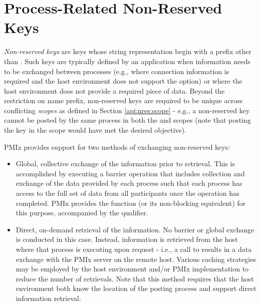 \chapter{Process-Related Non-Reserved Keys}
\label{chap:nrkeys}

\emph{Non-reserved keys} are keys whose string representation begin with a
prefix other than . Such keys are typically defined by an
application when information needs to be exchanged between processes (e.g.,
where connection information is required and the host environment does not
support the  option) or where the host environment does not
provide a required piece of data. Beyond the restriction on name prefix,
non-reserved keys are required to be unique across conflicting \emph{scopes} as defined in Section \ref{api:nres:scope} - e,g., a non-reserved key cannot be posted by the same process in both the  and  scopes (note that posting the key in the  scope would have met the desired objective).

\ac{PMIx} provides support for two methods of exchanging non-reserved keys:

\begin{itemize}
    \item Global, collective exchange of the information prior to retrieval. This is accomplished by executing a barrier operation that includes collection and exchange of the data provided by each process such that each process has access to the full set of data from all participants once the operation has completed. \ac{PMIx} provides the  function (or its non-blocking equivalent) for this purpose, accompanied by the  qualifier.
    \item Direct, on-demand retrieval of the information. No barrier or global exchange is conducted in this case. Instead, information is retrieved from the host where that process is executing upon request - i.e., a call to  results in a data exchange with the \ac{PMIx} server on the remote host. Various caching strategies may be employed by the host environment and/or \ac{PMIx} implementation to reduce the number of retrievals. Note that this method requires that the host environment both know the location of the posting process and support direct information retrieval.
\end{itemize}

